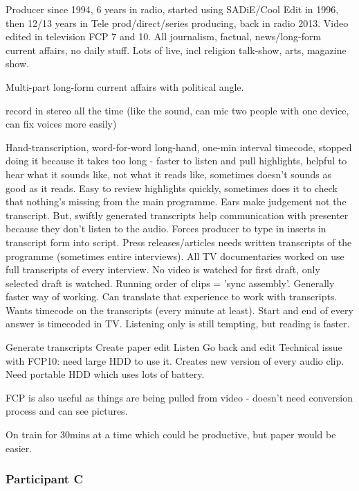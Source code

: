 Producer since 1994, 6 years in radio, started using SADiE/Cool Edit in 1996,
then 12/13 years in Tele prod/direct/series producing, back in radio 2013.
Video edited in television FCP 7 and 10. All journalism, factual,
news/long-form current affairs, no daily stuff. Lots of live, incl religion
talk-show, arts, magazine show.

Multi-part long-form current affairs with political angle.

record in stereo all the time (like the sound, can mic two people with one
device, can fix voices more easily)

Hand-transcription, word-for-word long-hand, one-min interval timecode, stopped
doing it because it takes too long - faster to listen and pull highlights,
helpful to hear what it sounds like, not what it reads like, sometimes doesn't
sounds as good as it reads. Easy to review highlights quickly, sometimes does
it to check that nothing's missing from the main programme. Ears make judgement
not the transcript. But, swiftly generated transcripts help communication with
presenter because they don't listen to the audio. Forces producer to type in
inserts in transcript form into script. Press releases/articles needs written
transcripts of the programme (sometimes entire interviews). All TV
documentaries worked on use full transcripts of every interview. No video is
watched for first draft, only selected draft is watched. Running order of clips
= 'sync assembly'. Generally faster way of working. Can translate that
experience to work with transcripts. Wants timecode on the transcripts (every
minute at least). Start and end of every answer is timecoded in TV. Listening
only is still tempting, but reading is faster.

Generate transcripts
Create paper edit
Listen
Go back and edit
Technical issue with FCP10: need large HDD to use it. Creates new version of
every audio clip. Need portable HDD which uses lots of battery.

FCP is also useful as things are being pulled from video - doesn't need
conversion process and can see pictures. 

On train for 30mins at a time which could be productive, but paper would be
easier.

\subsubsection{Participant C}

